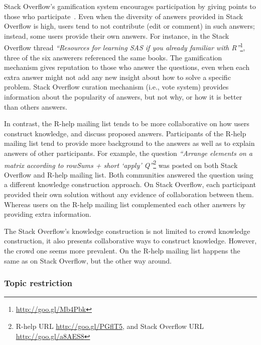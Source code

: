\documentclass{sig-alternate-05-2015}
\begin{document}
	Stack Overflow's gamification system encourages participation by giving points to those who participate~\cite{Singer2013}.
	Even when the diversity of answers provided in Stack Overflow is high, users tend to not contribute (edit or comment) in such answers; instead, some users provide their own answers.
	For instance, in the Stack Overflow thread \textit{``Resources for learning SAS if you already familiar with R''}\footnote{\url{http://goo.gl/Mb4Pbk}}, three of the six answerers referenced the same books.
	The gamification mechanism gives reputation to those who answer the questions, even when each extra answer might not add any new insight about how to solve a specific problem.
	Stack Overflow curation mechanism (i.e., vote system) provides information about the popularity of answers, but not why, or how it is better than others answers.

	In contrast, the R-help mailing list tends to be more collaborative on how users construct knowledge, and discuss proposed answers.
	Participants of the R-help mailing list tend to provide more background to the answers as well as to explain answers of other participants.
	For example, the question \textit{``Arrange elements on a matrix according to rowSums + short `apply' Q''}\footnote{R-help URL \url{http://goo.gl/PGflT5}, and Stack Overflow URL \url{http://goo.gl/a8AES8}} was posted on both Stack Overflow and R-help mailing list.
	Both communities answered the question using a different knowledge construction approach.
	On Stack Overflow, each participant provided their own solution without any evidence of collaboration between them.
	Whereas users on the R-help mailing list complemented each other answers by providing extra information.

	The Stack Overflow's knowledge construction is not limited to crowd knowledge construction, it also presents collaborative ways to construct knowledge.
	However, the crowd one seems more prevalent.
	On the R-help mailing list happens the same as on Stack Overflow, but the other way around.

	\subsubsection{Topic restriction}
\end{document}
